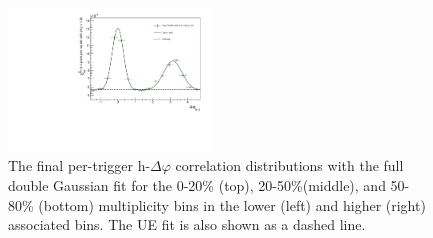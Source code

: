\begin{figure}[ht]
    \includegraphics[width=0.48\textwidth]{figures/analysis/h_lambda_dphi_gaus_50_80_highpt.pdf}
    \caption{The final per-trigger h-\lmb $\Delta\varphi$ correlation distributions with the full double Gaussian fit for the 0-20\% (top), 20-50\%(middle), and 50-80\% (bottom) multiplicity bins in the lower (left) and higher (right) associated \pt bins. The UE fit is also shown as a dashed line.}
    \label{fig:double_gaus_fits_lambda}
\end{figure}
